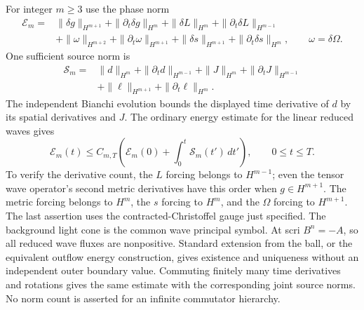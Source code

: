For integer $m\geq3$ use the phase norm
\begin{align*}
 \mathcal E_m={}&\|\delta g\|_{H^{m+1}}+
 \|\partial_t\delta g\|_{H^m}
 +\|\delta L\|_{H^m}+\|\partial_t\delta L\|_{H^{m-1}}\\
 &+\|\omega\|_{H^{m+2}}+\|\partial_t\omega\|_{H^{m+1}}
 +\|\delta s\|_{H^{m+1}}+\|\partial_t\delta s\|_{H^m},
 \qquad\omega=\delta\Omega.
\end{align*}
One sufficient source norm is
\begin{align*}
 \mathcal S_m={}&\|d\|_{H^m}+\|\partial_td\|_{H^{m-1}}
 +\|J\|_{H^m}+\|\partial_tJ\|_{H^{m-1}}\\
 &+\|\ell\|_{H^{m+1}}+\|\partial_t\ell\|_{H^m}.
\end{align*}
The independent Bianchi evolution bounds the displayed time derivative of
$d$ by its spatial derivatives and $J$.
The ordinary energy estimate for the linear reduced waves gives
\begin{equation}
 \mathcal E_m(t)\leq C_{m,T}\left(
 \mathcal E_m(0)+\int_0^t\mathcal S_m(t')\,dt'\right),\qquad 0\leq t\leq T.
 \label{eq:sourced-cefe-mixed-energy}
\end{equation}
To verify the derivative count, the $L$ forcing belongs to $H^{m-1}$;
even the tensor wave operator's second metric derivatives have this order
when $g\in H^{m+1}$.  The metric forcing belongs to $H^m$, the $s$ forcing
to $H^m$, and the $\Omega$ forcing to $H^{m+1}$.  The last assertion uses
the contracted-Christoffel gauge just specified.  The background light cone
is the common wave principal symbol.  At scri $B^n=-A$, so all reduced wave
fluxes are nonpositive.  Standard extension from the ball, or the equivalent
outflow energy construction, gives existence and uniqueness without an
independent outer boundary value.  Commuting finitely many time derivatives
and rotations gives the same estimate with the corresponding joint source
norms.  No norm count is asserted for an infinite commutator hierarchy.

